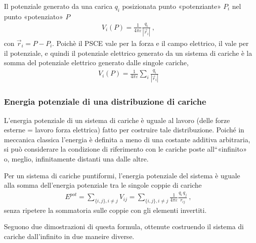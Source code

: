 \documentclass[letterpaper,10pt,italian]{jupyterBook}
\begin{document}
\sphinxAtStartPar
Il potenziale generato da una carica \(q_i\) posizionata punto «potenziante» \(P_i\) nel punto «potenziato» \(P\)
\begin{equation*}
\begin{split}V_i(P) = \frac{1}{4 \pi \varepsilon} \frac{q_i}{|\vec{r}_i|} \ ,\end{split}
\end{equation*}
\sphinxAtStartPar
con \(\vec{r}_i = P - P_i\). Poichè il PSCE vale per la forza e il campo elettrico, il  vale per il potenziale, e quindi il potenziale elettrico generato da un sistema di cariche è la somma del potenziale elettrico generato dalle singole cariche,
\begin{equation*}
\begin{split}V_i(P) = \frac{1}{4 \pi \varepsilon} \sum_i \frac{q_{i}}{\left|\vec{r}_{i}\right|} \end{split}
\end{equation*}

\subsubsection{Energia potenziale di una distribuzione di cariche}
\label{\detokenize{ch/electromagnetism/electrostatics:energia-potenziale-di-una-distribuzione-di-cariche}}\label{\detokenize{ch/electromagnetism/electrostatics:physics-hs-electromagnetism-electrostatics-e-field-energy}}
\sphinxAtStartPar
L’energia potenziale di un sistema di cariche è uguale al lavoro (delle forze esterne = \sphinxhyphen{} lavoro forza elettrica) fatto per costruire tale distribuzione. Poiché in meccanica classica l’energia è definita a meno di una costante additiva arbitraria, si può considerare la condizione di riferimento con le cariche poste all“«infinito» o, meglio, infinitamente distanti una dalle altre.

\sphinxAtStartPar
Per un sistema di cariche puntiformi, l’energia potenziale del sistema è uguale alla somma dell’energia potenziale tra le singole coppie di cariche
\begin{equation*}
\begin{split}E^{pot} = \sum_{\{i,j\}, i \ne j} V_{ij} = \sum_{\{i,j\}, i \ne j} \frac{1}{4 \pi \varepsilon} \frac{{q}_{i} \, q_{j}}{r_{ij}} \ ,\end{split}
\end{equation*}
\sphinxAtStartPar
senza ripetere la sommatoria sulle coppie con gli elementi invertiti.

\sphinxAtStartPar
Seguono due dimostrazioni di questa formula, ottenute costruendo il sistema di cariche dall’infinito in due maneire diverse.
\end{document}
